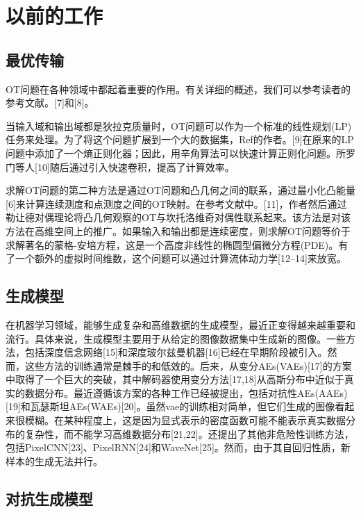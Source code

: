 
\section{以前的工作}

\subsection{最优传输}

OT问题在各种领域中都起着重要的作用。有关详细的概述，我们可以参考读者的参考文献。[7]和[8]。

当输入域和输出域都是狄拉克质量时，OT问题可以作为一个标准的线性规划(LP)任务来处理。为了将这个问题扩展到一个大的数据集，Ref的作者。[9]在原来的LP问题中添加了一个熵正则化器；因此，用辛角算法可以快速计算正则化问题。所罗门等人[10]随后通过引入快速卷积，提高了计算效率。

求解OT问题的第二种方法是通过OT问题和凸几何之间的联系，通过最小化凸能量[6]来计算连续测度和点测度之间的OT映射。在参考文献中。[11]，作者然后通过勒让德对偶理论将凸几何观察的OT与坎托洛维奇对偶性联系起来。该方法是对该方法在高维空间上的推广。如果输入和输出都是连续密度，则求解OT问题等价于求解著名的蒙格-安培方程，这是一个高度非线性的椭圆型偏微分方程(PDE)。有了一个额外的虚拟时间维数，这个问题可以通过计算流体动力学[12–14]来放宽。

\subsection{生成模型}

在机器学习领域，能够生成复杂和高维数据的生成模型，最近正变得越来越重要和流行。具体来说，生成模型主要用于从给定的图像数据集中生成新的图像。一些方法，包括深度信念网络[15]和深度玻尔兹曼机器[16]已经在早期阶段被引入。然而，这些方法的训练通常是棘手的和低效的。后来，从变分AEs(VAEs)[17]的方案中取得了一个巨大的突破，其中解码器使用变分方法[17,18]从高斯分布中近似于真实的数据分布。最近遵循该方案的各种工作已经被提出，包括对抗性AEs(AAEs)[19]和瓦瑟斯坦AEs(WAEs)[20]。虽然vae的训练相对简单，但它们生成的图像看起来很模糊。在某种程度上，这是因为显式表示的密度函数可能不能表示真实数据分布的复杂性，而不能学习高维数据分布[21,22]。还提出了其他非危险性训练方法，包括PixelCNN[23]、PixelRNN[24]和WaveNet[25]。然而，由于其自回归性质，新样本的生成无法并行。

\subsection{对抗生成模型}

